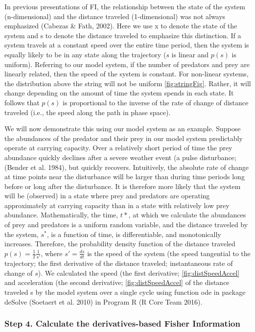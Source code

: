 \documentclass[12pt,twoside]{reedthesis}
\begin{document}
In previous presentations of FI, the relationship between the state of
the system (n-dimensional) and the distance traveled (1-dimensional) was
not always emphasized (Cabezas \& Fath, 2002). Here we use x to denote
the state of the system and s to denote the distance traveled to
emphasize this distinction. If a system travels at a constant speed over
the entire time period, then the system is equally likely to be in any
state along the trajectory (\(s\) is linear and \(p(s)\) is uniform).
Referring to our model system, if the number of predators and prey are
linearly related, then the speed of the system is constant. For
non-linear systems, the distribution above the string will not be
uniform \ref{fig:stringFig}. Rather, it will change depending on the
amount of time the system spends in each state. It follows that \(p(s)\)
is proportional to the inverse of the rate of change of distance
traveled (i.e., the speed along the path in phase space).

We will now demonstrate this using our model system as an example.
Suppose the abundances of the predator and their prey in our model
system predictably operate at carrying capacity. Over a relatively short
period of time the prey abundance quickly declines after a severe
weather event (a pulse disturbance; (Bender et al. 1984), but quickly
recovers. Intuitively, the absolute rate of change at time points near
the disturbance will be larger than during time periods long before or
long after the disturbance. It is therefore more likely that the system
will be (observed) in a state where prey and predators are operating
approximately at carrying capacity than in a state with relatively low
prey abundance. Mathematically, the time, \(t*\), at which we calculate
the abundances of prey and predators is a uniform random variable, and
the distance traveled by the system, \(s^*\), is a function of time, is
differentiable, and monotonically increases. Therefore, the probability
density function of the distance traveled
\(p(s)=\frac{1}{T}\frac{1}{s'}\), where \(s'= \frac{ds}{dt}\) is the
speed of the system (the speed tangential to the trajectory; the first
derivative of the distance traveled; instantaneous rate of change of
\(s\)). We calculated the speed (the first derivative;
\ref{fig:distSpeedAccel} and acceleration (the second derivative;
\ref{fig:distSpeedAccel} of the distance traveled s by the model system
over a single cycle using function ode in package deSolve (Soetaert et
al. 2010) in Program R (R Core Team 2016).

\subsubsection{\texorpdfstring{\textbf{Step 4.} Calculate the
derivatives-based Fisher
Information}{Step 4. Calculate the derivatives-based Fisher Information}}\label{step-4.-calculate-the-derivatives-based-fisher-information}
\end{document}
